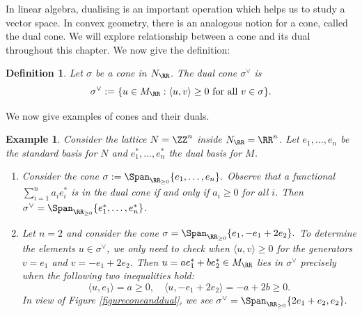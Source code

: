 \documentclass[12pt]{amsart}
\theoremstyle{plain}
\newtheorem{definition}[theorem]{Definition}
\newtheorem{example}[theorem]{Example}
\begin{document}
In linear algebra, dualising is an important operation which helps us to study a vector space.
In convex geometry, there is an analogous notion for a cone, called the dual cone.
We will explore relationship between a cone and its dual throughout this chapter.
We now give the definition:

\begin{definition}
Let $\sigma$ be a cone in $N_\RR$.
The dual cone $\sigma^\vee$ is
$$\sigma^\vee := \{u \in M_\RR : \langle u, v \rangle \ge 0 \text{ for all } v \in \sigma\}.$$
\end{definition}

We now give examples of cones and their duals.

\begin{example}\label{example:conesandduals}
Consider the lattice $N = \ZZ^n$ inside $N_\RR = \RR^n$.
Let $e_1, \ldots, e_n$ be the standard basis for $N$ and $e_1^*, \ldots, e_n^*$ the dual basis for $M$.
\begin{enumerate}
\item
Consider the cone $\sigma := \Span_{\RR_{\ge 0}}\{e_1, \ldots, e_n\}.$
Observe that a functional $\sum_{i=1}^n a_i e_i^*$ is in the dual cone if and only if $a_i \ge 0$ for all $i$.
Then $\sigma^\vee = \Span_{\RR_{\ge 0}}\{e_1^*, \ldots, e_n^*\}$.

\item
Let $n = 2$ and consider the cone $\sigma = \Span_{\RR_{\ge 0}} \{e_1, - e_1 + 2 e_2\}.$
To determine the elements $u\in\sigma^\vee$, we only need to check when $\langle u, v \rangle \ge 0$ for the generators $v = e_1$ and $v = -e_1 + 2 e_2$.
Then $u = a e_1^* + b e_2^* \in M_\RR$ lies in $\sigma^\vee$ precisely when the following two inequalities hold:
$$\langle u, e_1 \rangle = a \ge 0, \quad \langle u, -e_1 + 2e_2 \rangle = -a + 2b \ge 0.$$
In view of Figure \ref{figureconeanddual}, we see  $\sigma^\vee = \Span_{\RR_{\ge 0}} \{2 e_1 + e_2, e_2\}.$
\end{enumerate}
\end{example}
\end{document}
